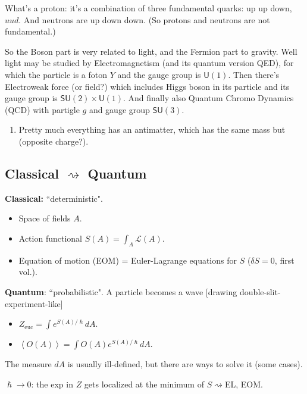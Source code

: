 \begin{question}\leavevmode
What's a proton: it's a combination of three fundamental quarks: up up down,
$uud$. And neutrons are up down down. (So protons and neutrons are not
fundamental.)
\end{question}

So the Boson part is very related to light, and the Fermion part to gravity.
Well light may be studied by Electromagnetism (and its quantum version QED), for
which the particle is a foton \(Y\) and the gauge group is \(\mathsf{U}(1)\).
Then there's Electroweak force (or field?) which includes Higgs boson in its
particle and its gauge group is \(\mathsf{SU}(2)\times \mathsf{U}(1)\). And
finally also Quantum Chromo Dynamics (QCD) with partigle \(g\) and gauge group
\(\mathsf{SU}(3)\).

\begin{remark}\leavevmode
\begin{enumerate}
\item Pretty much everything has an antimatter, which has the same mass but
(opposite charge?).
\end{enumerate}
\end{remark}

\subsection{Classical \(\rightsquigarrow \) Quantum}

\textbf{Classical:} ``deterministic".
\begin{itemize}
\item Space of fields \(A\).
\item Action functional \(S(A)= \int_A \mathcal{L}(A)\).
\item Equation of motion (EOM) = Euler-Lagrange equations for \(S\) (\(\delta
S=0\), first vol.).
\end{itemize}

\textbf{Quantum}: ``probabilistic". A particle becomes a wave [drawing
double-slit-experiment-like]
\begin{itemize}
\item \(Z_{\operatorname{euc}}=\int e^{S(A)/\hslash}dA\).
\item \(\left<O(A)\right>=\int O(A)e^{S(A)/\hslash}dA\).
\end{itemize}

\begin{remark}\leavevmode
The measure \(dA\) is usually ill-defined, but there are ways to solve it (some
cases).

\(\hslash \to 0\): the exp in \(Z\) gets localized at the minimum of \(S
\rightsquigarrow \)EL, EOM.
\end{remark}

